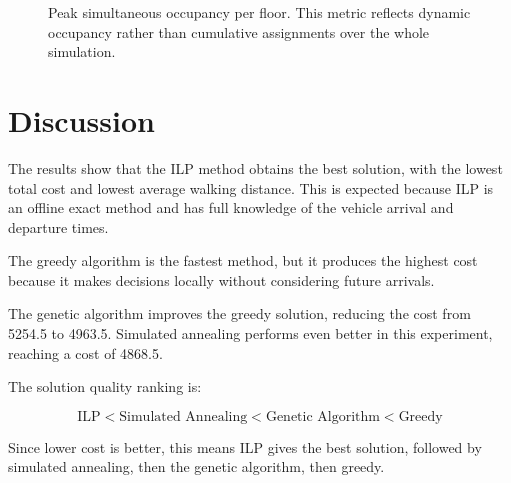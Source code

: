 \documentclass[12pt,a4paper]{article}
\begin{document}
\begin{figure}[H]
\centering
{}
\caption{Peak simultaneous occupancy per floor. This metric reflects dynamic occupancy rather than cumulative assignments over the whole simulation.}
\label{fig:occupancy}
\end{figure}

\section{Discussion}

The results show that the ILP method obtains the best solution, with the lowest total cost and lowest average walking distance. This is expected because ILP is an offline exact method and has full knowledge of the vehicle arrival and departure times.

The greedy algorithm is the fastest method, but it produces the highest cost because it makes decisions locally without considering future arrivals.

The genetic algorithm improves the greedy solution, reducing the cost from 5254.5 to 4963.5. Simulated annealing performs even better in this experiment, reaching a cost of 4868.5.

The solution quality ranking is:

\begin{equation}
\text{ILP} < \text{Simulated Annealing} < \text{Genetic Algorithm} < \text{Greedy}
\end{equation}

Since lower cost is better, this means ILP gives the best solution, followed by simulated annealing, then the genetic algorithm, then greedy.
\end{document}
